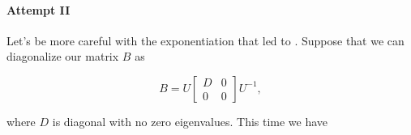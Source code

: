 %
%

\paragraph{Attempt II}

Let's be more careful with the exponentiation that led to .  Suppose that we can diagonalize our matrix \(B\) as

\begin{dmath}\label{eqn:threeSpringLoopattemptII:600}
B =
U
\begin{bmatrix}
D & 0 \\
0 & 0
\end{bmatrix}
U^{-1},
\end{dmath}

where \(D\) is diagonal with no zero eigenvalues.  This time we have

